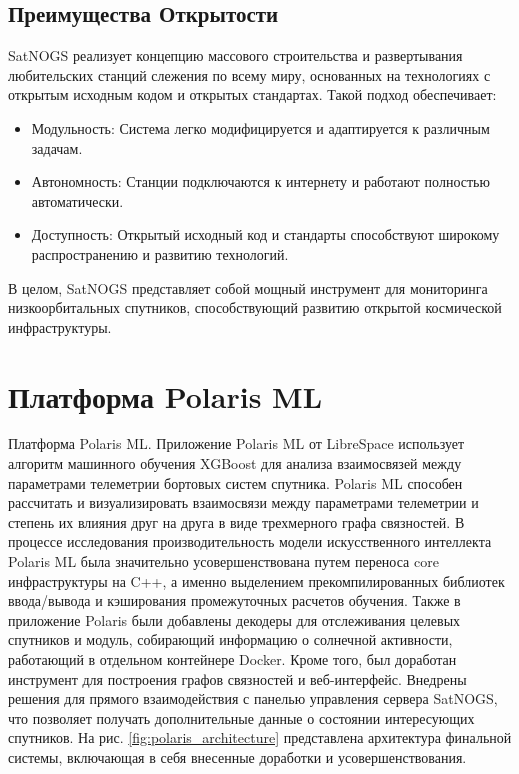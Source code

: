 \documentclass[12pt, a4paper]{extreport}
\begin{document}
\subsection{Преимущества Открытости}

SatNOGS реализует концепцию массового строительства и развертывания любительских станций слежения по всему миру, основанных на технологиях с открытым исходным кодом и открытых стандартах. Такой подход обеспечивает:

\begin{itemize}[label=\textbullet]
    \item	Модульность: Система легко модифицируется и адаптируется к различным задачам.
    \item	Автономность: Станции подключаются к интернету и работают полностью автоматически.
    \item	Доступность: Открытый исходный код и стандарты способствуют широкому распространению и развитию технологий.
\end{itemize}

В целом, SatNOGS представляет собой мощный инструмент для мониторинга низкоорбитальных спутников, способствующий развитию открытой космической инфраструктуры.

\newpage

\section{Платформа Polaris ML}

Платформа Polaris ML. Приложение Polaris ML от LibreSpace использует алгоритм машинного обучения XGBoost для анализа взаимосвязей между параметрами телеметрии бортовых систем спутника. Polaris ML способен рассчитать и визуализировать взаимосвязи между параметрами телеметрии и степень их влияния друг на друга в виде трехмерного графа связностей. В процессе исследования производительность модели искусственного интеллекта Polaris ML была значительно усовершенствована путем переноса core инфраструктуры на C++, а именно выделением прекомпилированных библиотек ввода/вывода и кэширования промежуточных расчетов обучения. Также в приложение Polaris были добавлены декодеры для отслеживания целевых спутников и модуль, собирающий информацию о солнечной активности, работающий в отдельном контейнере Docker. Кроме того, был доработан инструмент для построения графов связностей и веб-интерфейс. Внедрены решения для прямого взаимодействия с панелью управления сервера SatNOGS, что позволяет получать дополнительные данные о состоянии интересующих спутников.
На рис. \ref{fig:polaris_architecture} представлена архитектура финальной системы, включающая в себя внесенные доработки и усовершенствования.
\end{document}
